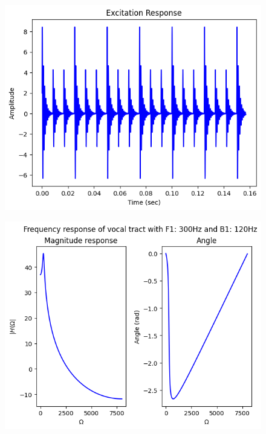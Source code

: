 \documentclass{article}
\begin{document}
\begin{figure}[H]
\begin{center}
\includegraphics[scale = 0.5]{Q3_BR.png}
\end{center}
\end{figure}


\begin{figure}[H]
\begin{center}
\includegraphics[scale = 0.5]{Q3_C.png}
\end{center}
\end{figure}
\end{document}
